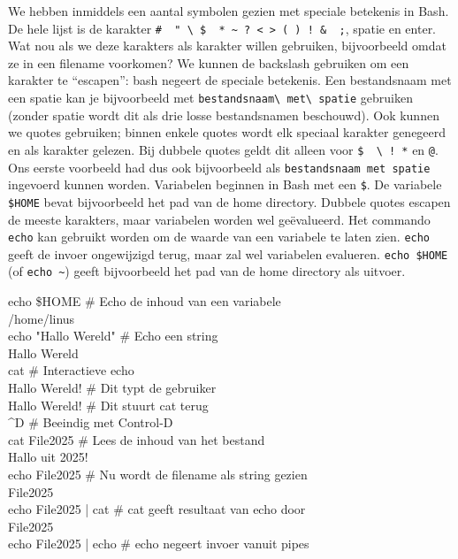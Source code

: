 We hebben inmiddels een aantal symbolen gezien met speciale betekenis in Bash. De hele lijst is de karakter \texttt{\#\ \textquotesingle{}\ "\ \textbackslash{}\ \$\ \textasciigrave{}\ *\ \textasciitilde\ ?\ \textless{}\ \textgreater{}\ (\ )\ !\ \&\ \textbar{}\ ;}, spatie en enter. Wat nou als we deze karakters als karakter willen gebruiken, bijvoorbeeld omdat ze in een filename voorkomen? We kunnen de backslash gebruiken om een karakter te ``escapen'': bash negeert de speciale betekenis. Een bestandsnaam met een spatie kan je bijvoorbeeld met \texttt{bestandsnaam\textbackslash{}\ met\textbackslash{}\ spatie} gebruiken (zonder spatie wordt dit als drie losse bestandsnamen beschouwd). Ook kunnen we quotes gebruiken; binnen enkele quotes wordt elk speciaal karakter genegeerd en als karakter gelezen. Bij dubbele quotes geldt dit alleen voor \texttt{\$\ \textasciigrave{}\ \textbackslash{}\ !\ *} en \texttt{@}. Ons eerste voorbeeld had dus ook bijvoorbeeld als \texttt{\textquotesingle{}bestandsnaam\ met\ spatie\textquotesingle{}} ingevoerd kunnen worden. Variabelen beginnen in Bash met een \texttt{\$}. De variabele \texttt{\$HOME} bevat bijvoorbeeld het pad van de home directory. Dubbele quotes escapen de meeste karakters, maar variabelen worden wel geëvalueerd. Het commando \texttt{echo} kan gebruikt worden om de waarde van een variabele te laten zien. \texttt{echo} geeft de invoer ongewijzigd terug, maar zal wel variabelen evalueren. \texttt{echo\ \$HOME} (of \texttt{echo\ \textasciitilde}) geeft bijvoorbeeld het pad van de home directory als uitvoer.

\begin{bash}
\userprompt echo  \$HOME             \# Echo de inhoud van een variabele\\
/home/linus\\

\userprompt echo "Hallo Wereld"     \# Echo een string\\
Hallo Wereld\\

\userprompt cat                     \# Interactieve echo\\
Hallo Wereld!                                \# Dit typt de gebruiker\\
Hallo Wereld!                                \# Dit stuurt cat terug\\
\textasciicircum D                                           \# Beeindig met Control-D\\

\userprompt cat File2025            \# Lees de inhoud van het bestand\\
Hallo uit 2025!\\

\userprompt echo File2025           \# Nu wordt de filename als string gezien\\
File2025\\

\userprompt echo File2025 | cat     \# cat geeft resultaat van echo door\\
File2025\\

\userprompt echo File2025 | echo    \# echo negeert invoer vanuit pipes\\
\end{bash}


